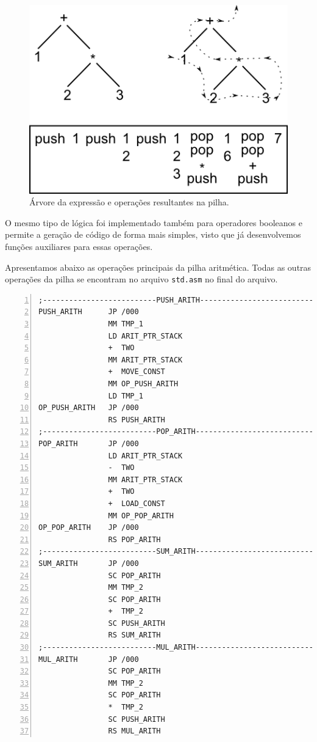 \begin{figure}[htbp]
    \centering
    \includegraphics[width=.6\textwidth]{./img/arith.png}
    \caption{Árvore da expressão e operações resultantes na pilha.}
    \label{figure:example}
\end{figure}

O mesmo tipo de lógica foi implementado também para operadores booleanos e
permite a geração de código de forma mais simples, visto que já desenvolvemos
funções auxiliares para essas operações.

Apresentamos abaixo as operações principais da pilha aritmética. Todas as
outras operações da pilha se encontram no arquivo \verb!std.asm! no final do arquivo.


\begin{lstlisting}[frame=single,numbers=left,breaklines=true]
;--------------------------PUSH_ARITH------------------------------
PUSH_ARITH      JP /000
                MM TMP_1
                LD ARIT_PTR_STACK 
                +  TWO
                MM ARIT_PTR_STACK
                +  MOVE_CONST
                MM OP_PUSH_ARITH
                LD TMP_1
OP_PUSH_ARITH   JP /000 
                RS PUSH_ARITH 
;--------------------------POP_ARITH-------------------------------
POP_ARITH       JP /000 
                LD ARIT_PTR_STACK 
                -  TWO
                MM ARIT_PTR_STACK 
                +  TWO 
                +  LOAD_CONST 
                MM OP_POP_ARITH
OP_POP_ARITH    JP /000
                RS POP_ARITH 
;--------------------------SUM_ARITH-------------------------------
SUM_ARITH       JP /000 
                SC POP_ARITH
                MM TMP_2 
                SC POP_ARITH
                +  TMP_2 
                SC PUSH_ARITH
                RS SUM_ARITH 
;--------------------------MUL_ARITH-------------------------------
MUL_ARITH       JP /000 
                SC POP_ARITH
                MM TMP_2 
                SC POP_ARITH 
                *  TMP_2 
                SC PUSH_ARITH
                RS MUL_ARITH 
\end{lstlisting}


